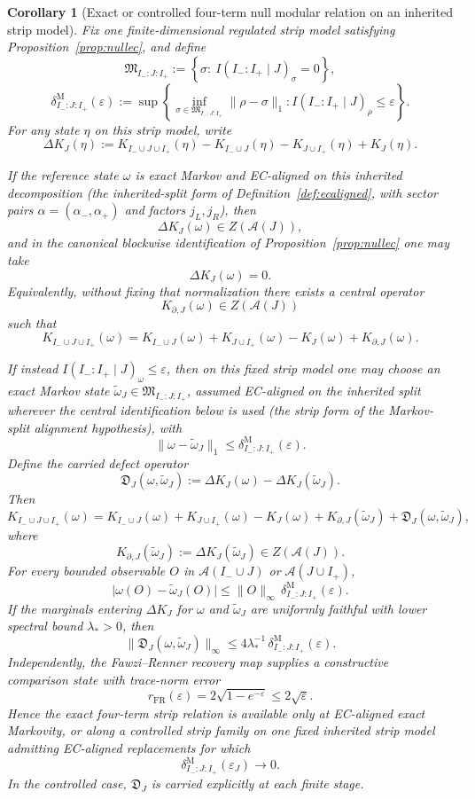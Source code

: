 \documentclass[11pt]{article}
\newtheorem{corollary}[theorem]{Corollary}
\begin{document}
\begin{corollary}[Exact or controlled four-term null modular relation on an inherited strip model]\label{cor:n1}
Fix one finite-dimensional regulated strip model satisfying Proposition~\ref{prop:nullec}, and define
\[
\mathfrak M_{I_-:J:I_+}
:=
\left\{
\sigma:\ I(I_-:I_+\mid J)_\sigma=0
\right\},
\]
\[
\delta^{\mathrm M}_{I_-:J:I_+}(\varepsilon)
:=
\sup\left\{
\inf_{\sigma\in\mathfrak M_{I_-:J:I_+}}\|\rho-\sigma\|_1:
I(I_-:I_+\mid J)_\rho\le \varepsilon
\right\}.
\]
For any state \(\eta\) on this strip model, write
\[
\Delta K_J(\eta)
:=
K_{I_-\cup J\cup I_+}(\eta)-K_{I_-\cup J}(\eta)-K_{J\cup I_+}(\eta)+K_J(\eta).
\]

If the reference state \(\omega\) is exact Markov and EC-aligned on this inherited decomposition (the inherited-split form of Definition~\ref{def:ecaligned}, with sector pairs \(\alpha=(\alpha_-,\alpha_+)\) and factors \(j_L,j_R\)), then
\[
\Delta K_J(\omega)\in Z(\mathcal A(J)),
\]
and in the canonical blockwise identification of Proposition~\ref{prop:nullec} one may take
\[
\Delta K_J(\omega)=0.
\]
Equivalently, without fixing that normalization there exists a central operator
\[
K_{\partial,J}(\omega)\in Z(\mathcal A(J))
\]
such that
\[
K_{I_-\cup J\cup I_+}(\omega)
=
K_{I_-\cup J}(\omega)+K_{J\cup I_+}(\omega)-K_J(\omega)+K_{\partial,J}(\omega).
\]

If instead \(I(I_-:I_+\mid J)_\omega\le \varepsilon\), then on this fixed strip model one may choose an exact Markov state \(\widetilde\omega_J\in \mathfrak M_{I_-:J:I_+}\), assumed EC-aligned on the inherited split wherever the central identification below is used (the strip form of the Markov-split alignment hypothesis), with
\[
\|\omega-\widetilde\omega_J\|_1
\le
\delta^{\mathrm M}_{I_-:J:I_+}(\varepsilon).
\]
Define the carried defect operator
\[
\mathfrak D_J(\omega,\widetilde\omega_J)
:=
\Delta K_J(\omega)-\Delta K_J(\widetilde\omega_J).
\]
Then
\[
K_{I_-\cup J\cup I_+}(\omega)
=
K_{I_-\cup J}(\omega)+K_{J\cup I_+}(\omega)-K_J(\omega)
+K_{\partial,J}(\widetilde\omega_J)
+\mathfrak D_J(\omega,\widetilde\omega_J),
\]
where
\[
K_{\partial,J}(\widetilde\omega_J):=\Delta K_J(\widetilde\omega_J)\in Z(\mathcal A(J)).
\]
For every bounded observable \(O\) in \(\mathcal A(I_-\cup J)\) or \(\mathcal A(J\cup I_+)\),
\[
\bigl|\omega(O)-\widetilde\omega_J(O)\bigr|
\le
\|O\|_\infty\,
\delta^{\mathrm M}_{I_-:J:I_+}(\varepsilon).
\]
If the marginals entering \(\Delta K_J\) for \(\omega\) and \(\widetilde\omega_J\) are uniformly faithful with lower spectral bound \(\lambda_\ast>0\), then
\[
\|\mathfrak D_J(\omega,\widetilde\omega_J)\|_\infty
\le
4\lambda_\ast^{-1}\,
\delta^{\mathrm M}_{I_-:J:I_+}(\varepsilon).
\]
Independently, the Fawzi--Renner recovery map supplies a constructive comparison state with trace-norm error
\[
r_{\mathrm{FR}}(\varepsilon)
=
2\sqrt{1-e^{-\varepsilon}}
\le
2\sqrt{\varepsilon}.
\]
Hence the exact four-term strip relation is available only at EC-aligned exact Markovity, or along a controlled strip family on one fixed inherited strip model admitting EC-aligned replacements for which
\[
\delta^{\mathrm M}_{I_-:J:I_+}(\varepsilon_J)\to 0.
\]
In the controlled case, \(\mathfrak D_J\) is carried explicitly at each finite stage.
\end{corollary}
\end{document}
